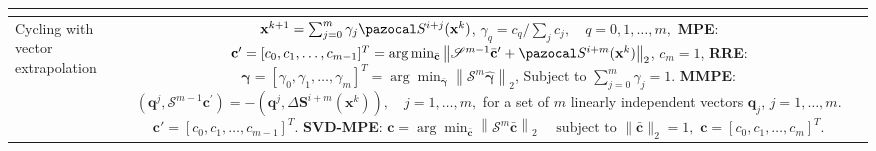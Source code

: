 \begin{table}[htbp]
\begin{tabular}{l c}
{    }\\
    \hline
    \makecell[l]{Cycling with\\ vector extrapolation} & \makecell[l]{\vphantom{\Huge |}
    \(\mathbf x^{k+1} = \sum_{j=0}^m \gamma_j \pazocal S^{i+j}(\mathbf x^k)\),\\
    \(\gamma_q = c_q/\sum_j c_j,\quad q=0,1,\dots,m,\)\\
    \textbf{MPE}: \(\mathbf c ' = [c_0,c_1,\dots,c_{m-1}]^T = \arg \min_{\bar{\mathbf c}} \left\|\mathscr S^{m-1} \bar{\mathbf c}^\prime + \pazocal S^{i+m}(\mathbf x^k)\right\|_2\),\\
    \(c_m=1\),\\
    \textbf{RRE}: \(\boldsymbol{\gamma} = [\gamma_0,\gamma_1,\dots,\gamma_{m}]^T = \arg \min_{\bar{\boldsymbol{ \gamma}}} \left\|\mathscr S^{m} \hat{\boldsymbol{\gamma}}\right\|_2\),\\
    Subject to \(\sum_{j=0}^m \gamma_j =1\).\\
    \textbf{MMPE}: \(\left(\mathbf q^{j}, \mathscr S^{m-1} \mathbf c^{\prime}\right)=-\left(\mathbf q^{j}, \Delta \mathbf S^{i+m}(\mathbf x^k)\right), \quad j=1, \ldots, m,\)\\
    for a set of \(m\) linearly independent vectors \(\mathbf q_j\), \(j=1, \dots, m\).\\
    \(\mathbf c ' = [c_0,c_1,\dots,c_{m-1}]^T.\)\\
    \textbf{SVD-MPE}: \(\mathbf c = \arg\min_{\bar{\mathbf c}}\left\|\mathscr S^{m} \bar{\mathbf c}\right\|_{2} \quad \text { subject to }\|\bar{\mathbf c}\|_{2}=1,\)\\
    \(\mathbf c=\left[c_{0}, c_{1}, \ldots, c_{m}\right]^{T}\).
    }\\
  \hline\hline
  \end{tabular}
\end{table}
